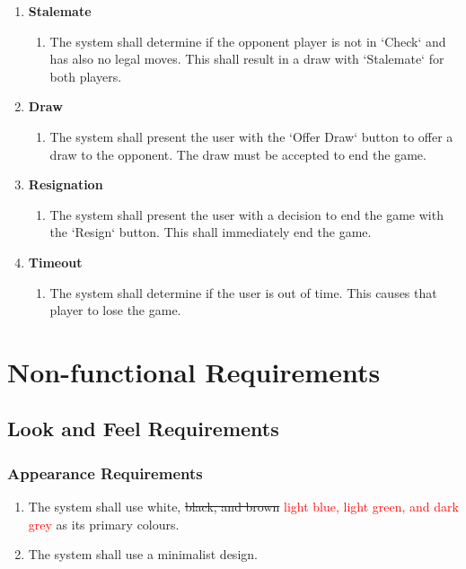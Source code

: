 \documentclass[12pt, titlepage]{article}
\begin{document}
\begin{enumerate}[{UC}1.]
        	\item \textbf{Stalemate}
        	\begin{enumerate}[{FR}1., resume]
        		\item The system shall determine if the opponent player is not in `Check` and has also no legal moves. This shall result in a draw with `Stalemate` for both players.
        	\end{enumerate}
        	
        	\item \textbf{Draw}
        	\begin{enumerate}[{FR}1., resume]
        		\item The system shall present the user with the `Offer Draw` button to offer a draw to the opponent. The draw must be accepted to end the game.
        	\end{enumerate}
        	
        	\item \textbf{Resignation}
        	\begin{enumerate}[{FR}1., resume]
        	    \item The system shall present the user with a decision to end the game with the `Resign` button. This shall immediately end the game.
        	\end{enumerate}
        	
        	\item \textbf{Timeout}
        	\begin{enumerate}[{FR}1., resume]
        		\item The system shall determine if the user is out of time. This causes that player to lose the game.
        	\end{enumerate}
        \end{enumerate}
    
\section{Non-functional Requirements}

    \subsection{Look and Feel Requirements}
    
    \subsubsection{Appearance Requirements}
    \begin{enumerate}[{LF}1., leftmargin=2\parindent]
    	\item The system shall use white, \sout{black, and brown} \textcolor{red}{light blue, light green, and dark grey} as its primary colours.
    	\item The system shall use a minimalist design.
    \end{enumerate}
    
\end{document}
